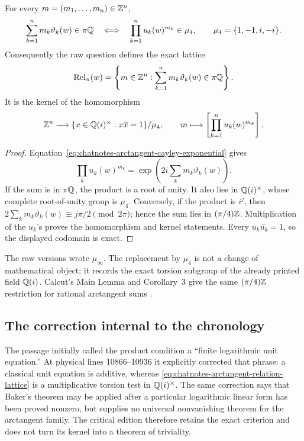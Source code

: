 \begin{proposition}
\label{prop:chatnotes-arctangent-torsion-criterion}
For every \(m=(m_1,\ldots,m_n)\in\mathbb{Z}^n\),
\begin{equation}
\label{eq:chatnotes-arctangent-relation-lattice}
 \sum_{k=1}^n m_k\vartheta_k(w)\in\pi\mathbb{Q}
 \quad\Longleftrightarrow\quad
 \prod_{k=1}^n u_k(w)^{m_k}\in\mu_4,
 \qquad \mu_4=\{1,-1,i,-i\}.
\end{equation}
Consequently the raw question defines the exact lattice
\[
 \operatorname{Rel}_{\pi}(w)=
 \left\{m\in\mathbb{Z}^n:
 \sum_{k=1}^n m_k\vartheta_k(w)\in\pi\mathbb{Q}\right\}.
\]
It is the kernel of the homomorphism
\[
 \mathbb{Z}^n\longrightarrow
 \{x\in\mathbb{Q}(i)^\times:x\overline{x}=1\}/\mu_4,\qquad
 m\longmapsto\left[\prod_{k=1}^n u_k(w)^{m_k}\right].
\]
\end{proposition}

\begin{proof}
Equation~\eqref{eq:chatnotes-arctangent-cayley-exponential} gives
\[
 \prod_k u_k(w)^{m_k}
 =\exp\!\left(2i\sum_km_k\vartheta_k(w)\right).
\]
If the sum is in \(\pi\mathbb{Q}\), the product is a root of unity.  It also lies in
\(\mathbb{Q}(i)^\times\), whose complete root-of-unity group is \(\mu_4\).  Conversely,
if the product is \(i^j\), then
\(2\sum_km_k\vartheta_k(w)\equiv j\pi/2\pmod{2\pi}\); hence the sum lies in
\((\pi/4)\mathbb{Z}\).  Multiplication of the \(u_k\)'s proves the homomorphism and
kernel statements.  Every \(u_k\overline{u_k}=1\), so the displayed codomain
is exact.
\end{proof}

The raw versions wrote \(\mu_\infty\).  The replacement by \(\mu_4\) is not a
change of mathematical object: it records the exact torsion subgroup of the
already printed field \(\mathbb{Q}(i)\).  Calcut's Main Lemma and Corollary~3 give the
same \((\pi/4)\mathbb{Z}\) restriction for rational arctangent sums
\cite{Calcut2009}.

\subsection{The correction internal to the chronology}

The passage initially called the product condition a ``finite logarithmic
unit equation.''  At physical lines 10866--10936 it explicitly corrected that
phrase: a classical unit equation is additive, whereas
\eqref{eq:chatnotes-arctangent-relation-lattice} is a multiplicative torsion
test in \(\mathbb{Q}(i)^\times\).  The same correction says that Baker's theorem may
be applied after a particular logarithmic linear form has been proved
nonzero, but supplies no universal nonvanishing theorem for the arctangent
family.  The critical edition therefore retains the exact criterion and does
not turn its kernel into a theorem of triviality.

